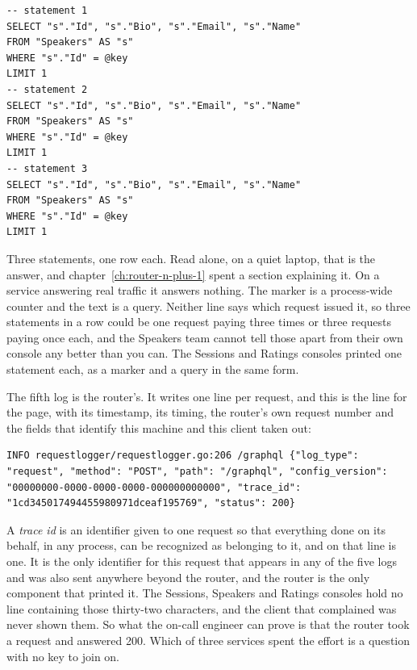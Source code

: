 \begin{verbatim}
-- statement 1
SELECT "s"."Id", "s"."Bio", "s"."Email", "s"."Name"
FROM "Speakers" AS "s"
WHERE "s"."Id" = @key
LIMIT 1
-- statement 2
SELECT "s"."Id", "s"."Bio", "s"."Email", "s"."Name"
FROM "Speakers" AS "s"
WHERE "s"."Id" = @key
LIMIT 1
-- statement 3
SELECT "s"."Id", "s"."Bio", "s"."Email", "s"."Name"
FROM "Speakers" AS "s"
WHERE "s"."Id" = @key
LIMIT 1
\end{verbatim}

%
Three statements, one row each. Read alone, on a quiet laptop, that is the
answer, and chapter~\ref{ch:router-n-plus-1} spent a section explaining it.
On a service answering real traffic it answers nothing. The marker is a
process-wide counter and the text is a query. Neither line says which request
issued it, so three statements in a row could be one request paying three
times or three requests paying once each, and the Speakers team cannot tell
those apart from their own console any better than you can. The Sessions and
Ratings consoles printed one statement each, as a marker and a query in the
same form.

%
The fifth log is the router's. It writes one line per request, and this is
the line for the page, with its timestamp, its timing, the router's own
request number and the fields that identify this machine and this client
taken out:

\begin{verbatim}
INFO requestlogger/requestlogger.go:206 /graphql {"log_type": "request", "method": "POST", "path": "/graphql", "config_version": "00000000-0000-0000-0000-000000000000", "trace_id": "1cd345017494455980971dceaf195769", "status": 200}
\end{verbatim}

%
A \emph{trace id} is an identifier given to one request so that everything
done on its behalf, in any process, can be recognized as belonging to it, and
 on that line is one. It is the only identifier for this
request that appears in any of the five logs and was also sent anywhere
beyond the router, and the router is the only component that printed it. The Sessions, Speakers and Ratings consoles hold no line
containing those thirty-two characters, and the client that complained was
never shown them. So what the on-call engineer can prove is that the router
took a request and answered 200. Which of three services spent the effort is a
question with no key to join on.
%
